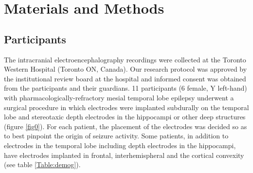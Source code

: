 \documentclass[11pt, onecolumn]{article}
\begin{document}
\section{Materials and Methods}
\label{se:maandme}
\subsection{Participants}
The intracranial electroencephalography recordings were collected at the Toronto Western Hospital (Toronto ON, Canada). Our research protocol was approved by the institutional review board at the hospital and informed consent was obtained from the participants and their guardians. 11 participants (6 female, Y left-hand) with pharmacologically-refractory mesial temporal lobe epilepsy underwent a surgical procedure in which electrodes were implanted subdurally on the temporal lobe and stereotaxic depth electrodes in the hippocampi or other deep structures (figure \ref{fig0}).
For each patient, the placement of the electrodes was decided so as to
best pinpoint the origin of seizure activity. Some patients, in addition to electrodes in the temporal lobe including depth electrodes in the hippocampi, have   electrodes implanted in frontal, interhemispheral and the cortical convexity (see table \ref{Table:demog}). 
\end{document}
